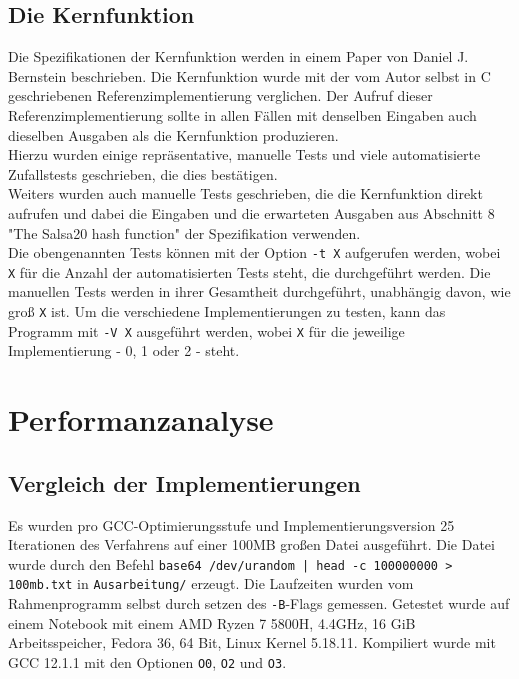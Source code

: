 \documentclass[course=erap]{aspdoc}
\begin{document}
\subsection{Die Kernfunktion}
Die Spezifikationen der Kernfunktion werden in einem Paper von Daniel J. Bernstein beschrieben.\cite{salsa20specification}
Die Kernfunktion wurde mit der vom Autor selbst in C geschriebenen Referenzimplementierung verglichen.\cite{salsa20}
Der Aufruf dieser Referenzimplementierung sollte in allen Fällen mit denselben Eingaben auch dieselben Ausgaben
als die Kern\-funk\-tion produzieren. 
\\Hierzu wurden einige repräsentative, manuelle Tests und viele automatisierte Zufallstests 
geschrieben, die dies bestätigen.
\\Weiters wurden auch manuelle Tests geschrieben, die die Kernfunktion direkt aufrufen und dabei 
die Eingaben und die erwarteten Ausgaben aus Abschnitt 8 "The Salsa20 hash function" der Spezifikation 
verwenden.\cite{salsa20specification}
\\Die obengenannten Tests können mit der Option \texttt{-t X} aufgerufen werden, wobei \texttt{X} für die Anzahl der automatisierten 
Tests steht, die durchgeführt werden. Die manuellen Tests werden in ihrer Gesamtheit durchgeführt, unabhängig davon, 
wie groß \texttt{X} ist. Um die verschiedene Implementierungen zu testen, kann das Programm mit \texttt{-V X} ausgeführt werden, 
wobei \texttt{X} für die jeweilige Implementierung - 0, 1 oder 2 - steht.


\section{Performanzanalyse} \label{perf}
\subsection{Vergleich der Implementierungen}
Es wurden pro GCC-Optimierungsstufe und Implementierungsversion 25 
Iterationen des Verfahrens auf einer 100MB großen Datei ausgeführt. Die Datei
wurde durch den Befehl \texttt{base64 /dev/urandom | head -c 100000000 > 100mb.txt}
in \texttt{Ausarbeitung/} er\-zeugt.
Die Laufzeiten wurden vom Rahmenprogramm selbst durch setzen des \texttt{-B}-Flags
gemessen. Getestet wurde auf einem Notebook mit einem AMD Ryzen 7 5800H, 
4.4GHz, 16 GiB Arbeitsspeicher, Fedora 36, 64 Bit, Linux Kernel 5.18.11.
Kompiliert wurde mit GCC 12.1.1 mit den Optionen \texttt{O0}, \texttt{O2} und \texttt{O3}.
\end{document}

